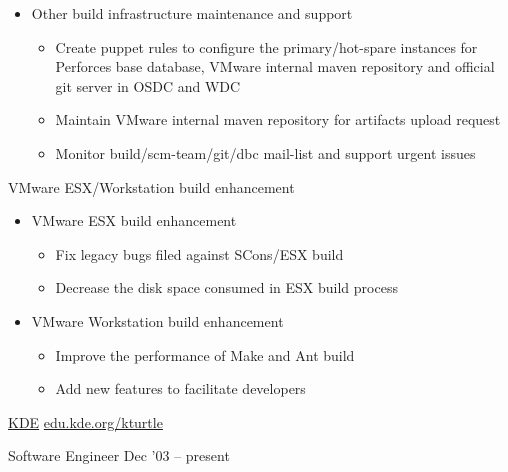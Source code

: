 \documentclass[10pt,letterpaper]{article}
\begin{document}
{{\begin{itemize}
        \item Other build infrastructure maintenance and support
            \begin{itemize}
                \item   Create puppet rules to configure the primary/hot-spare instances for
                    Perforces base database, VMware internal maven repository and official git
                    server in OSDC and WDC
                \item   Maintain VMware internal maven repository for artifacts upload request
                \item   Monitor build/scm-team/git/dbc mail-list and support urgent issues
            \end{itemize}

    \end{itemize}
}
\headedsubsection %
{VMware ESX/Workstation build enhancement} {}
{
    \begin{itemize}
        \item VMware ESX build enhancement
            \begin{itemize}
                \item   Fix legacy bugs filed against SCons/ESX build
                \item   Decrease the disk space consumed in ESX build process
            \end{itemize}
        \item VMware Workstation build enhancement
            \begin{itemize}
            \item   Improve the performance of Make and Ant build
            \item   Add new features to facilitate developers
            \end{itemize}
    \end{itemize}
}
}


\headedsection %
{\href{http://www.kde.org}{KDE}}
{\href{http://edu.kde.org/kturtle}{edu.kde.org/kturtle}} {

\headedsubsection %
{Software Engineer}
{Dec '03 -- present}
{}
}
\end{document}
